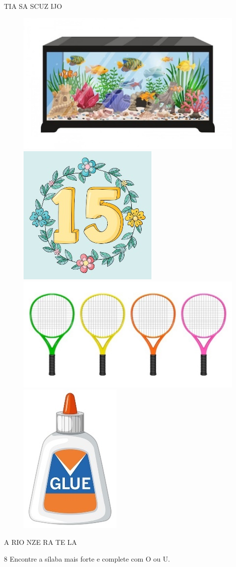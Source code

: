  TIA \hspace{2cm}  SA \hspace{2cm}  SCUZ \hspace{2cm}  IJO

\begin{figure}[htpb!]
\includegraphics[width=.24\textwidth]{media/image30.jpeg}
\includegraphics[width=.24\textwidth]{media/image31.jpeg}
\includegraphics[width=.24\textwidth]{media/image32.jpeg}
\includegraphics[width=.24\textwidth]{media/image33.jpeg}
\end{figure}

A  RIO \hspace{1cm}  NZE \hspace{1cm} RA  TE \hspace{1cm}  LA


\num{8} Encontre a sílaba mais forte e complete com O ou U.


